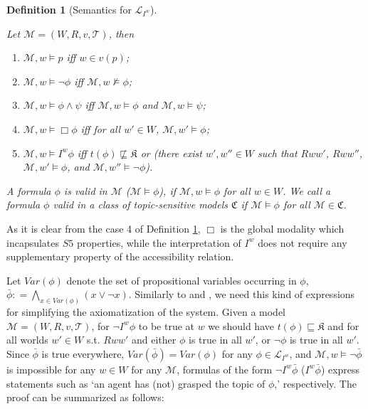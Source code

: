 \documentclass{article}
\newtheorem{defi}{Definition}
\begin{document}
\begin{defi}[Semantics for $\mathcal{L}_{I^{w}}$]
\label{semHIW}

Let $\mathcal{M} = (W, R, v, \mathcal{T})$, then

\begin{enumerate}

\item $\mathcal{M}, w \models p$ iff $w \in v(p)$;

\item $\mathcal{M}, w \models \neg \phi$ iff $\mathcal{M}, w \not \models \phi$;

\item $\mathcal{M}, w \models \phi \wedge \psi$ iff $\mathcal{M}, w \models \phi$ and $\mathcal{M}, w \models \psi$;

\item $\mathcal{M}, w \models \Box \phi$ iff for all $w' \in W$, $\mathcal{M}, w' \models \phi$;

\item $\mathcal{M}, w \models I^{w} \phi$ iff $t(\phi) \not \sqsubseteq \mathfrak{K}$ or (there exist $w', w'' \in W$ such that $Rww'$, $Rww''$, $\mathcal{M}, w' \models \phi$, and $\mathcal{M}, w'' \models \neg \phi$).


\end{enumerate}


A formula $\phi$ is valid  in $\mathcal{M}$ ($\mathcal{M} \models \phi$), if $\mathcal{M}, w \models \phi$ for all $w \in W$. We call a formula $\phi$ valid in a class of topic-sensitive models $\mathfrak{C}$ if $\mathcal{M} \models \phi$ for all $\mathcal{M} \in \mathfrak{C}$.

\end{defi}

As it is clear from the case 4 of Definition \ref{semHIW}, $\Box$ is the global modality which incapsulates $S5$ properties, while the interpretation of $I^{w}$ does not require any supplementary property of the accessibility relation. 

Let $Var(\phi)$ denote the set of propositional variables occurring in $\phi$, $\bar{\phi} : = \bigwedge_{x \in Var(\phi)} (x \vee \neg x)$. Similarly to \citep{Berto2021} and \citep{Ozgun2023}, we need this kind of expressions for simplifying the axiomatization of the system. Given a model $\mathcal{M} = (W, R, v, \mathcal{T})$, for $\neg I^{w} \phi$ to be true at $w$ we should have $t(\phi) \sqsubseteq \mathfrak{K}$ and for all worlds $w' \in W$ s.t. $Rww'$ and either $\phi$ is true in all $w'$, or $\neg \phi$ is true in all $w'$. Since $\bar{\phi}$ is true everywhere, $Var(\bar{\phi}) = Var(\phi)$ for any $\phi \in \mathcal{L}_{I^{w}}$, and $\mathcal{M}, w \models \neg \bar{\phi}$ is impossible for any $w \in W$ for any $\mathcal{M}$, formulas of the form $\neg I^{w} \bar{\phi}$ ($I^{w} \bar{\phi}$) express statements such as `an agent has (not) grasped the topic of $\phi$,' respectively. The proof can be summarized as follows:
\end{document}
